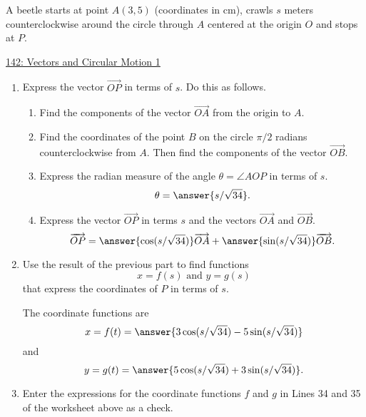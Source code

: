 \documentclass{ximera}
\begin{document}
\begin{question} \label{QIDdfdseIFDfeD}
A beetle starts at point $A(3,5)$ (coordinates in cm), crawls $s$ meters counterclockwise around the circle through $A$ centered at the origin $O$ and stops at $P$.

\begin{onlineOnly}
    \begin{center}
\end{center}
\end{onlineOnly}

\href{https://www.desmos.com/calculator/ufyt7kkxc0}{142: Vectors and Circular Motion 1}


\begin{enumerate}
\item Express the vector $\overrightarrow{OP}$ in terms of $s$. Do this as follows.

\begin{enumerate}
\item Find the components of the vector $\overrightarrow{OA}$ from the origin to $A$.

\item Find the coordinates of the point $B$ on the circle $\pi/2$ radians counterclockwise from $A$. Then find the components of the vector $\overrightarrow{OB}$.

\item Express the radian measure of the angle $\theta = \angle AOP$ in terms of $s$.
\[
   \theta = \answer{s/\sqrt{34}} .
\]

\item Express the vector $\overrightarrow{OP}$ in terms $s$ and the vectors $\overrightarrow{OA}$ and $\overrightarrow{OB}$.
\[
      \overrightarrow{OP} = \answer{\cos (s/\sqrt{34})} \overrightarrow{OA} + \answer{\sin (s/\sqrt{34})} \overrightarrow{OB} . 
\]

\end{enumerate}

\item Use the result of the previous part to find functions
\[
 x = f(s)  \text{ and } y=g(s)
\]
that express the coordinates of $P$ in terms of $s$.

The coordinate functions are 
\[
    x = f(t) = \answer{3\cos(s/\sqrt{34}) - 5\sin(s/\sqrt{34})}
\]
and
\[
    y = g(t) = \answer{5\cos(s/\sqrt{34}) + 3\sin(s/\sqrt{34})}.
\]

\item Enter the expressions for the coordinate functions $f$ and $g$ in Lines 34 and 35 of the worksheet above as a check.


\end{enumerate}
\end{question}
\end{document}
